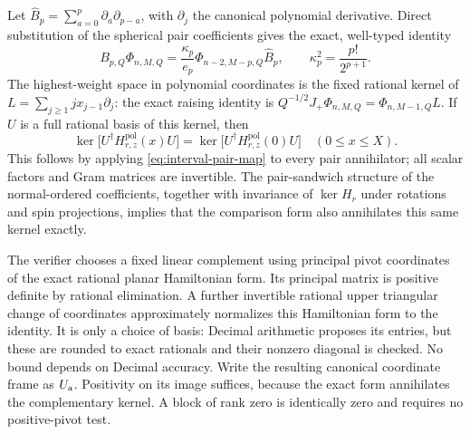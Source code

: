 Let $\widehat B_p=\sum_{a=0}^p\partial_a\partial_{p-a}$, with
$\partial_j$ the canonical polynomial derivative. Direct substitution
of the spherical pair coefficients gives the exact, well-typed identity
\begin{equation}\label{eq:interval-pair-map}
 B_{p,Q}\Phi_{n,M,Q}
 =\frac{\kappa_p}{e_p}\Phi_{n-2,M-p,Q}\widehat B_p,
 \qquad \kappa_p^2=\frac{p!}{2^{p+1}}.
\end{equation}
The highest-weight space in polynomial coordinates is the fixed rational
kernel of $L=\sum_{j\ge1}j x_{j-1}\partial_j$: the exact raising identity
is $Q^{-1/2}J_+\Phi_{n,M,Q}=\Phi_{n,M-1,Q}L$.
If $U$ is a full rational basis of this kernel, then
\begin{equation}\label{eq:interval-common-kernel}
 \ker\big[U^\dagger H^{\mathrm{pol}}_{r,z}(x)U\big]
 =\ker\big[U^\dagger H^{\mathrm{pol}}_{r,z}(0)U\big]
 \quad (0\le x\le X).
\end{equation}
This follows by applying \eqref{eq:interval-pair-map} to every pair
annihilator; all scalar factors and Gram matrices are invertible.
The pair-sandwich structure of the normal-ordered coefficients, together
with invariance of $\ker H_r$ under rotations and spin projections,
implies that the comparison form also annihilates this same kernel exactly.

The verifier chooses a fixed linear complement using principal pivot
coordinates of the exact rational planar Hamiltonian form. Its principal
matrix is positive definite by rational elimination. A further invertible
rational upper triangular change of coordinates approximately normalizes
this Hamiltonian form to the identity. It is only a choice of basis:
Decimal arithmetic proposes its entries, but these are rounded to exact
rationals and their nonzero diagonal is checked. No bound depends on
Decimal accuracy. Write the resulting canonical coordinate frame as
$U_{\rm a}$. Positivity on its image suffices, because the exact form
annihilates the complementary kernel. A block of rank zero is identically
zero and requires no positive-pivot test.

